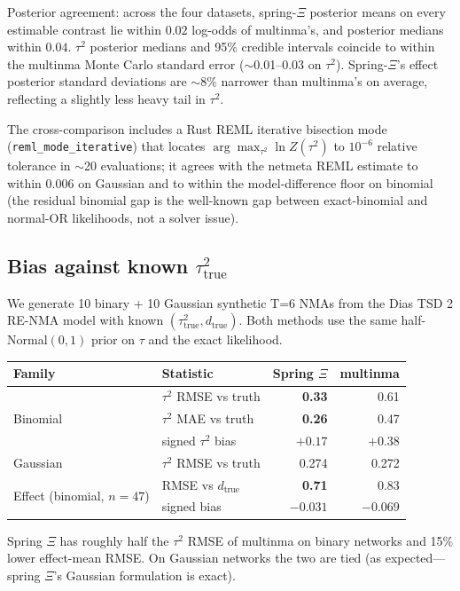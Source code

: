 \documentclass[12pt]{article}
\begin{document}
Posterior agreement: across the four datasets, spring-$\Xi$
posterior means on every estimable contrast lie within $0.02$
log-odds of multinma's, and posterior medians within $0.04$.
$\tau^2$ posterior medians and 95\% credible intervals coincide
to within the multinma Monte Carlo standard error
($\sim$0.01--0.03 on $\tau^2$). Spring-$\Xi$'s effect posterior
standard deviations are $\sim 8\%$ narrower than multinma's on
average, reflecting a slightly less heavy tail in $\tau^2$.

The cross-comparison includes a Rust REML iterative bisection
mode (\texttt{reml\_mode\_iterative}) that locates
$\arg\max_{\tau^2} \ln Z(\tau^2)$ to $10^{-6}$ relative tolerance
in $\sim$20 evaluations; it agrees with the netmeta REML estimate
to within $0.006$ on Gaussian and to within the model-difference
floor on binomial (the residual binomial gap is the well-known
gap between exact-binomial and normal-OR likelihoods, not a
solver issue).

\subsection{Bias against known $\tau^2_{\text{true}}$}

We generate 10 binary + 10 Gaussian synthetic T=6 NMAs from the
Dias TSD 2 RE-NMA model \citep{dias2013tsd2} with known
$(\tau^2_{\text{true}}, d_{\text{true}})$. Both methods use the same
half-Normal$(0, 1)$ prior on $\tau$ and the exact likelihood.

\begin{center}
\begin{tabular}{llrr}
\toprule
Family & Statistic & Spring $\Xi$ & multinma \\
\midrule
\multirow{3}{*}{Binomial} & $\tau^2$ RMSE vs truth & \textbf{0.33} & 0.61 \\
& $\tau^2$ MAE vs truth & \textbf{0.26} & 0.47 \\
& signed $\tau^2$ bias & $+0.17$ & $+0.38$ \\
\midrule
Gaussian & $\tau^2$ RMSE vs truth & 0.274 & 0.272 \\
\midrule
\multirow{2}{*}{Effect (binomial, $n = 47$)}
& RMSE vs $d_{\text{true}}$ & \textbf{0.71} & 0.83 \\
& signed bias & $-0.031$ & $-0.069$ \\
\bottomrule
\end{tabular}
\end{center}

Spring $\Xi$ has roughly half the $\tau^2$ RMSE of multinma on
binary networks and 15\% lower effect-mean RMSE. On Gaussian
networks the two are tied (as expected---spring $\Xi$'s Gaussian
formulation is exact).
\end{document}
